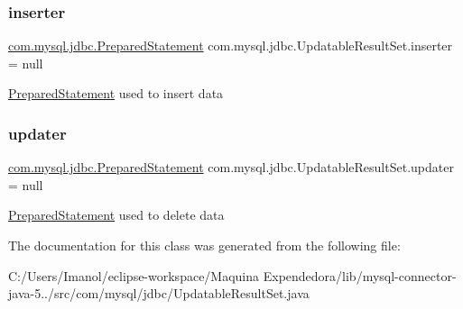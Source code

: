 \subsubsection{\texorpdfstring{inserter}{inserter}}
{\footnotesize\ttfamily \mbox{\hyperlink{classcom_1_1mysql_1_1jdbc_1_1_prepared_statement}{com.\+mysql.\+jdbc.\+Prepared\+Statement}} com.\+mysql.\+jdbc.\+Updatable\+Result\+Set.\+inserter = null\hspace{0.3cm}{\ttfamily [protected]}}

\mbox{\hyperlink{classcom_1_1mysql_1_1jdbc_1_1_prepared_statement}{Prepared\+Statement}} used to insert data \mbox{\label{classcom_1_1mysql_1_1jdbc_1_1_updatable_result_set_a865417da0d947e92e7859fb28301f93a}} 
\subsubsection{\texorpdfstring{updater}{updater}}
{\footnotesize\ttfamily \mbox{\hyperlink{classcom_1_1mysql_1_1jdbc_1_1_prepared_statement}{com.\+mysql.\+jdbc.\+Prepared\+Statement}} com.\+mysql.\+jdbc.\+Updatable\+Result\+Set.\+updater = null\hspace{0.3cm}{\ttfamily [protected]}}

\mbox{\hyperlink{classcom_1_1mysql_1_1jdbc_1_1_prepared_statement}{Prepared\+Statement}} used to delete data 

The documentation for this class was generated from the following file\+:\begin{DoxyCompactItemize}
\item 
C\+:/\+Users/\+Imanol/eclipse-\/workspace/\+Maquina Expendedora/lib/mysql-\/connector-\/java-\/5../src/com/mysql/jdbc/Updatable\+Result\+Set.\+java\end{DoxyCompactItemize}
